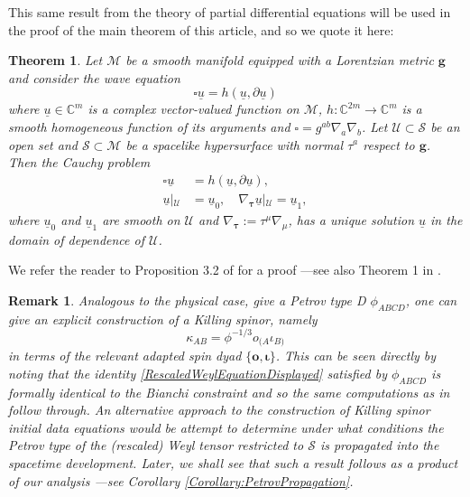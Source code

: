 \documentclass[10pt,a4paper]{article}
\theoremstyle{plain}
\newtheorem{theorem}{Theorem}
\newtheorem{remark}{Remark}
\def\bmg{{\bm g}}
\def\bmo{{\bm o}}
\begin{document}
This same result from the theory of partial differential
equations will be used in the proof of the main theorem of this
article, and so we quote it here:
\begin{theorem}
\label{TheoremHomogeneousWave}
 Let $\mathcal{M}$ be a smooth manifold equipped with a Lorentzian
 metric $\bmg$ and consider the wave equation
\[\square \underline{u}=h (\underline{u},\partial\underline{u})\]
where $\underline{u}\in\mathbb{C}^m$ is a complex vector-valued
function on $\mathcal{M}$, $h:\mathbb{C}^{2m}\rightarrow\mathbb{C}^m$
is a smooth homogeneous function of its arguments and
$\square=g^{ab}\nabla_{a}\nabla_{b}$.  Let
$\mathcal{U}\subset\mathcal{S}$ be an open set and $\mathcal{S}\subset
\mathcal{M}$ be a spacelike hypersurface with normal $\tau^{a}$
respect to $\bmg$. Then the Cauchy problem
\begin{align*}
\square \underline{u}&=h (\underline{u},
\partial\underline{u}),\\ \underline{u}\left|_{\mathcal{U}}\right.&=\underline{u}_0,
\quad
\nabla_{\bm\tau}\underline{u}\left|_{\mathcal{U}}\right.=\underline{u}_1,
\end{align*} 
where $\underline{u}_{0}$ and $\underline{u}_{1}$ are smooth on
$\mathcal{U}$ and $\nabla_{\bm\tau}:= \tau^\mu\nabla_\mu$, has a
unique solution $\underline{u}$ in the domain of dependence of
$\mathcal{U}$.
\end{theorem}
We refer the reader to Proposition 3.2 of \cite{Tay96c} for a proof
---see also Theorem 1 in \cite{GarVal08c}.

\begin{remark}{\em 
Analogous to the physical case, give a Petrov type D $\phi_{ABCD}$, 
one can give an explicit construction of a Killing spinor, namely
\begin{equation*}
\kappa_{AB} = \phi^{-1/3}o_{(A}\iota_{B)} %
\end{equation*}
in terms of the relevant adapted spin dyad $\lbrace \bmo, \bm\iota\rbrace$. This can be seen directly 
by noting that the identity \eqref{RescaledWeylEquationDisplayed} satisfied by $\phi_{ABCD}$ is formally 
identical to the Bianchi constraint and so the same computations as in \cite{WalkerPenrose70} follow through.
An alternative approach to the construction of Killing spinor initial data equations would be attempt to determine under what conditions the Petrov type of the (rescaled) Weyl tensor restricted to $\mathcal{S}$ is propagated into the spacetime development. Later, we shall see that such a result follows as a product of our analysis ---see Corollary \ref{Corollary:PetrovPropagation}.}\label{Remark:DyadExpressionForKillingSpinorInTypeD}
\end{remark}
\end{document}
